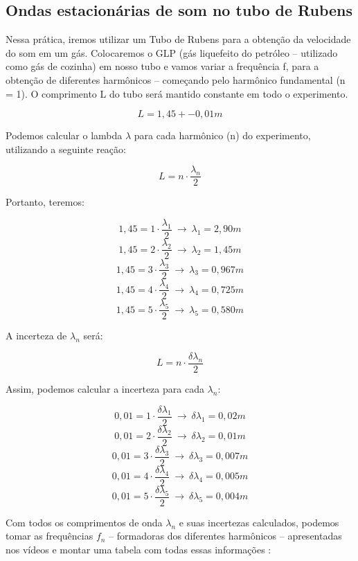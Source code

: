 \subsection{Ondas estacionárias de som no tubo de Rubens}

Nessa prática, iremos utilizar um Tubo de Rubens para a obtenção da velocidade do som em um gás. Colocaremos o GLP (gás liquefeito do petróleo – utilizado como gás de cozinha) em nosso tubo e vamos variar a frequência f, para a obtenção de diferentes harmônicos – começando pelo harmônico fundamental (n = 1). O comprimento L do tubo será mantido constante em todo o experimento. 

\[L = 1,45 +- 0,01 m\]

Podemos calcular o lambda  $\lambda$ para cada harmônico (n) do experimento, utilizando a seguinte reação:

\[ L = n \cdot \frac{\lambda _n}{2}\]

Portanto, teremos:

\[ 1,45 = 1 \cdot \frac{\lambda _1}{2} \ \to \ \lambda _1 = 2,90 m  \]
\[ 1,45 = 2 \cdot \frac{\lambda _2}{2} \ \to \ \lambda _2 = 1,45 m  \]
\[ 1,45 = 3 \cdot \frac{\lambda _3}{2} \ \to \ \lambda _3 = 0,967 m  \]
\[ 1,45 = 4 \cdot \frac{\lambda _4}{2} \ \to \ \lambda _4 = 0,725 m  \]
\[ 1,45 = 5 \cdot \frac{\lambda _5}{2} \ \to \ \lambda _5 = 0,580 m  \]

A incerteza de $\lambda _n$ será:

\[ L = n \cdot \frac{\delta \lambda _n}{2}\]

Assim, podemos calcular a incerteza para cada $\lambda _n$:

\[ 0,01 = 1 \cdot \frac{\delta \lambda _1}{2} \ \to \  \delta \lambda _1 = 0,02 m  \]
\[ 0,01 = 2 \cdot \frac{\delta \lambda _2}{2} \ \to \  \delta \lambda _2 = 0,01 m  \]
\[ 0,01 = 3 \cdot \frac{\delta \lambda _3}{2} \ \to \  \delta \lambda _3 = 0,007 m  \]
\[ 0,01 = 4 \cdot \frac{\delta \lambda _4}{2} \ \to \  \delta \lambda _4 = 0,005 m  \]
\[ 0,01 = 5 \cdot \frac{\delta \lambda _5}{2} \ \to \  \delta \lambda _5 = 0,004 m  \]

Com todos os comprimentos de onda $\lambda _n$ e suas incertezas calculados, podemos tomar as frequências $f_n$ -- formadoras dos diferentes harmônicos -- apresentadas nos vídeos e montar uma tabela com todas essas informações  :\\


